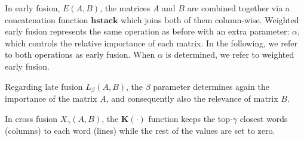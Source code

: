 \documentclass{llncs}
\begin{document}
In early fusion, $E(A,B)$, the matrices $A$ and $B$ are combined together via a concatenation function $\mathbf{hstack}$ which joins both of them column-wise. Weighted early fusion  represents the same operation as before with an extra parameter: $\alpha$, which controls the relative importance of each matrix. In the following, we refer to both operations as early fusion. When $\alpha$ is determined, we refer to weighted early fusion.

Regarding late fusion $L_\beta(A,B)$, the  $\beta$ parameter determines again the importance of the  matrix $A$,  and consequently also the relevance of matrix $B$.

In cross fusion $X_\gamma(A,B)$, the $\mathbf{K}(\cdot)$ function keeps the top-$\gamma$ closest words (columns) to each word (lines) while the rest of the values are set to zero. 
\end{document}
